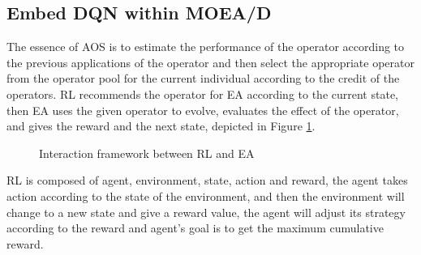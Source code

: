\documentclass[journal]{IEEEtran}
\begin{document}
\subsection{Embed DQN within MOEA/D}
The essence of AOS is to estimate the performance of the operator according to the previous applications of the operator and then select the appropriate operator from the operator pool for the current individual according to the credit of the operators.
RL recommends the operator for EA according to the current state, then EA uses the given operator to evolve, evaluates the effect of the operator, and gives the reward and the next state, depicted in Figure \ref{fig:RLEA}.
\begin{figure}[t]
  \centering
  \caption{Interaction framework between RL and EA}
  \label{fig:RLEA}
\end{figure}
RL is composed of agent, environment, state, action and reward, the agent takes action according to the state of the environment, and then the environment will change to a new state and give a reward value, the agent will adjust its strategy according to the reward and agent's goal is to get the maximum cumulative reward.
\end{document}
